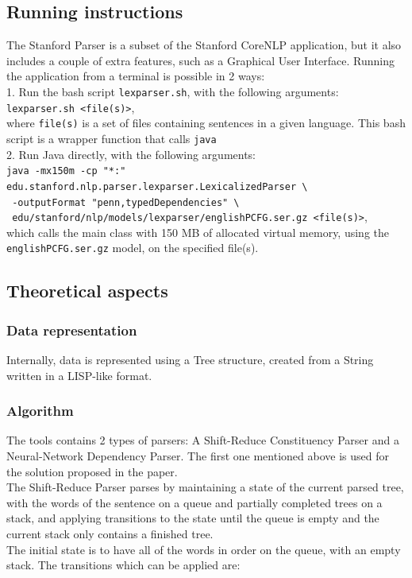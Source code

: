 \documentclass[a4paper,10pt]{article}
\begin{document}
 \subsection{Running instructions}
The Stanford Parser is a subset of the Stanford CoreNLP application, but it also includes a couple of extra features, such as a Graphical User Interface.
Running the application from a terminal is possible in 2 ways: \\
1. Run the bash script \verb|lexparser.sh|, with the following arguments: \verb|lexparser.sh <file(s)>|, \\
where \verb|file(s)| is a set of files containing sentences in a given language. This bash script is a wrapper function that calls \verb|java| \\
2. Run Java directly, with the following arguments: \\
\verb|java -mx150m -cp "*:" edu.stanford.nlp.parser.lexparser.LexicalizedParser \ | \\
\verb| -outputFormat "penn,typedDependencies" \ | \\
\verb| edu/stanford/nlp/models/lexparser/englishPCFG.ser.gz <file(s)>|, \\
which calls the main class with 150 MB of allocated virtual memory, using the \verb|englishPCFG.ser.gz| model, on the specified file(s).
 
 
 \subsection{Theoretical aspects}
  \subsubsection{Data representation}
  Internally, data is represented using a Tree structure, created from a String written in a LISP-like 
  format.
  \subsubsection{Algorithm}
 The tools contains 2 types of parsers: A Shift-Reduce Constituency Parser and a Neural-Network Dependency Parser. The first one mentioned above is used for the solution proposed in the paper. \\
 The Shift-Reduce Parser parses by maintaining a state of the current parsed tree, with the words of the sentence on a queue and partially completed trees on a stack, and applying transitions to the state until the queue is empty and the current stack only contains a finished tree. \\
 The initial state is to have all of the words in order on the queue, with an empty stack. The transitions which can be applied are:
 
\end{document}

